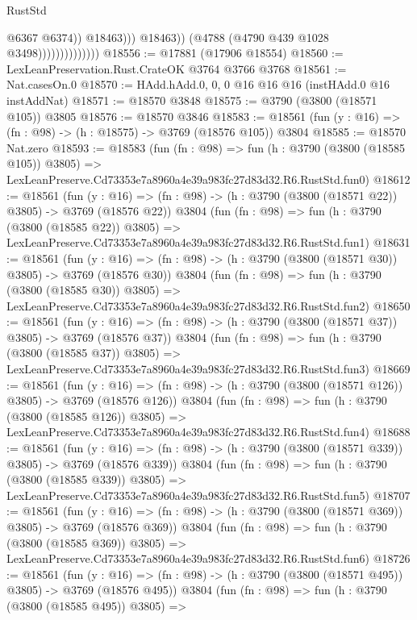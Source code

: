 \begin{lexlean}{RustStd}
\begin{coremodule}
                                          @6367
                                          @6374))
                                      @18463)))
                                @18463))
                            (@4788 (@4790 @439 @1028 @3498))))))))))))))
@18556 := @17881 (@17906 @18554)
@18560 := LexLeanPreservation.Rust.CrateOK @3764 @3766 @3768
@18561 := Nat.casesOn.{0}
@18570 := HAdd.hAdd.{0, 0, 0} @16 @16 @16 (instHAdd.{0} @16 instAddNat)
@18571 := @18570 @3848
@18575 := @3790 (@3800 (@18571 @105)) @3805
@18576 := @18570 @3846
@18583 := @18561 (fun (y : @16) => (fn : @98) -> (h : @18575) -> @3769 (@18576 @105)) @3804
@18585 := @18570 Nat.zero
@18593 := @18583
    (fun (fn : @98) =>
    fun (h : @3790 (@3800 (@18585 @105)) @3805) =>
    LexLeanPreserve.Cd73353e7a8960a4e39a983fc27d83d32.R6.RustStd.fun0)
@18612 := @18561
    (fun (y : @16) => (fn : @98) -> (h : @3790 (@3800 (@18571 @22)) @3805) -> @3769 (@18576 @22))
    @3804
    (fun (fn : @98) =>
    fun (h : @3790 (@3800 (@18585 @22)) @3805) =>
    LexLeanPreserve.Cd73353e7a8960a4e39a983fc27d83d32.R6.RustStd.fun1)
@18631 := @18561
    (fun (y : @16) => (fn : @98) -> (h : @3790 (@3800 (@18571 @30)) @3805) -> @3769 (@18576 @30))
    @3804
    (fun (fn : @98) =>
    fun (h : @3790 (@3800 (@18585 @30)) @3805) =>
    LexLeanPreserve.Cd73353e7a8960a4e39a983fc27d83d32.R6.RustStd.fun2)
@18650 := @18561
    (fun (y : @16) => (fn : @98) -> (h : @3790 (@3800 (@18571 @37)) @3805) -> @3769 (@18576 @37))
    @3804
    (fun (fn : @98) =>
    fun (h : @3790 (@3800 (@18585 @37)) @3805) =>
    LexLeanPreserve.Cd73353e7a8960a4e39a983fc27d83d32.R6.RustStd.fun3)
@18669 := @18561
    (fun (y : @16) => (fn : @98) -> (h : @3790 (@3800 (@18571 @126)) @3805) -> @3769 (@18576 @126))
    @3804
    (fun (fn : @98) =>
    fun (h : @3790 (@3800 (@18585 @126)) @3805) =>
    LexLeanPreserve.Cd73353e7a8960a4e39a983fc27d83d32.R6.RustStd.fun4)
@18688 := @18561
    (fun (y : @16) => (fn : @98) -> (h : @3790 (@3800 (@18571 @339)) @3805) -> @3769 (@18576 @339))
    @3804
    (fun (fn : @98) =>
    fun (h : @3790 (@3800 (@18585 @339)) @3805) =>
    LexLeanPreserve.Cd73353e7a8960a4e39a983fc27d83d32.R6.RustStd.fun5)
@18707 := @18561
    (fun (y : @16) => (fn : @98) -> (h : @3790 (@3800 (@18571 @369)) @3805) -> @3769 (@18576 @369))
    @3804
    (fun (fn : @98) =>
    fun (h : @3790 (@3800 (@18585 @369)) @3805) =>
    LexLeanPreserve.Cd73353e7a8960a4e39a983fc27d83d32.R6.RustStd.fun6)
@18726 := @18561
    (fun (y : @16) => (fn : @98) -> (h : @3790 (@3800 (@18571 @495)) @3805) -> @3769 (@18576 @495))
    @3804
    (fun (fn : @98) =>
    fun (h : @3790 (@3800 (@18585 @495)) @3805) =>

\end{coremodule}
\end{lexlean}
